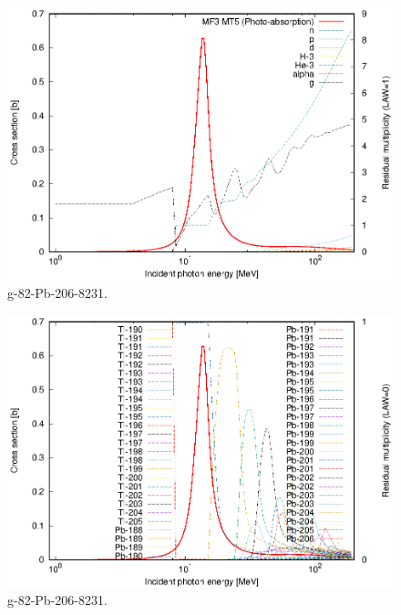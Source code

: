\begin{figure}
 \includegraphics[width=\linewidth]{eps/g_82-Pb-206_8231.eps}
  \caption{g-82-Pb-206-8231.}
\end{figure}
\begin{figure}
 \includegraphics[width=\linewidth]{eps-law0/g_82-Pb-206_8231.eps}
 \caption{g-82-Pb-206-8231.}
\end{figure}
\newpage \clearpage

